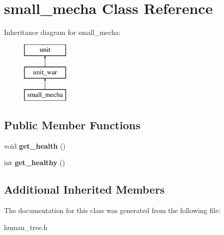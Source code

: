 \hypertarget{classsmall__mecha}{}\section{small\+\_\+mecha Class Reference}
\label{classsmall__mecha}
Inheritance diagram for small\+\_\+mecha\+:\begin{figure}[H]
\begin{center}
\leavevmode
\includegraphics[height=3.000000cm]{classsmall__mecha}
\end{center}
\end{figure}
\subsection*{Public Member Functions}
\begin{DoxyCompactItemize}
\item 
\mbox{\label{classsmall__mecha_abfaf595a7874e178ef9dc2e6cf300a13}} 
void {\bfseries get\+\_\+health} ()
\item 
\mbox{\label{classsmall__mecha_a6ca1bc2683c75e4a095865d0123cdb20}} 
int {\bfseries get\+\_\+healthy} ()
\end{DoxyCompactItemize}
\subsection*{Additional Inherited Members}


The documentation for this class was generated from the following file\+:\begin{DoxyCompactItemize}
\item 
human\+\_\+tree.\+h\end{DoxyCompactItemize}
